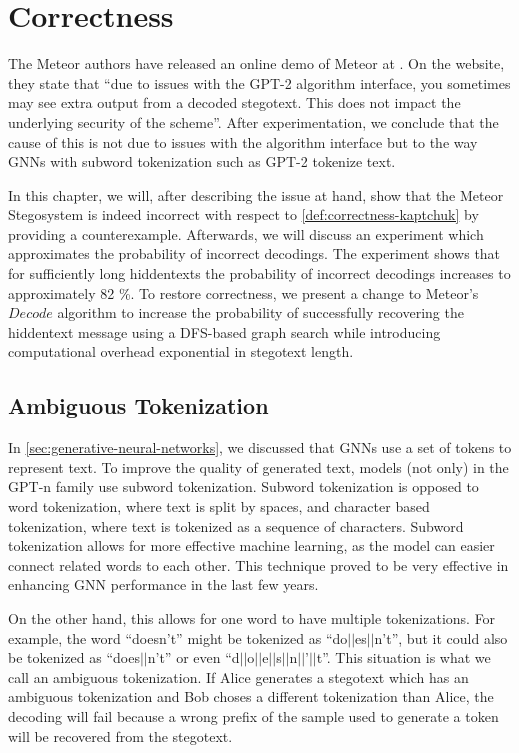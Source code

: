 \chapter{Correctness}
\label{chap:correctness}

The Meteor authors have released an online demo of Meteor at \cite{MeteorDemo2021}.
On the website, they state that ``due to issues with the GPT-2 algorithm interface, you sometimes may see extra output from a decoded stegotext. This does not impact the underlying security of the scheme''.
After experimentation, we conclude that the cause of this is not due to issues with the algorithm interface but to the way GNNs with subword tokenization such as GPT-2 tokenize text.

In this chapter, we will, after describing the issue at hand, show that the Meteor Stegosystem is indeed incorrect with respect to \autoref{def:correctness-kaptchuk} by providing a counterexample.
Afterwards, we will discuss an experiment which approximates the probability of incorrect decodings.
The experiment shows that for sufficiently long hiddentexts the probability of incorrect decodings increases to approximately 82 \%.
To restore correctness, we present a change to Meteor's $Decode$ algorithm to increase the probability of successfully recovering the hiddentext message using a DFS-based graph search while introducing computational overhead exponential in stegotext length.

\section{Ambiguous Tokenization}

In \autoref{sec:generative-neural-networks}, we discussed that GNNs use a set of tokens to represent text.
To improve the quality of generated text, models (not only) in the GPT-n family use subword tokenization.
Subword tokenization is opposed to word tokenization, where text is split by spaces, and character based tokenization, where text is tokenized as a sequence of characters.
Subword tokenization allows for more effective machine learning, as the model can easier connect related words to each other.
This technique proved to be very effective in enhancing GNN performance in the last few years.

On the other hand, this allows for one word to have multiple tokenizations.
For example, the word ``doesn't'' might be tokenized as ``do$||$es$||$n't'', but it could also be tokenized as ``does$||$n't'' or even ``d$||$o$||$e$||$s$||$n$||$'$||$t''.
This situation is what we call an ambiguous tokenization.
If Alice generates a stegotext which has an ambiguous tokenization and Bob choses a different tokenization than Alice, the decoding will fail because a wrong prefix of the sample used to generate a token will be recovered from the stegotext.

